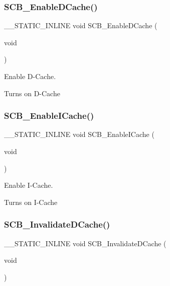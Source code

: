 \subsubsection{\texorpdfstring{SCB\_EnableDCache()}{SCB\_EnableDCache()}}
{\footnotesize\ttfamily \+\_\+\+\_\+\+S\+T\+A\+T\+I\+C\+\_\+\+I\+N\+L\+I\+NE void S\+C\+B\+\_\+\+Enable\+D\+Cache (\begin{DoxyParamCaption}\item[{void}]{ }\end{DoxyParamCaption})}



Enable D-\/\+Cache. 

Turns on D-\/\+Cache \mbox{\label{group__CMSIS__Core__CacheFunctions_gaf9e7c6c8e16ada1f95e5bf5a03505b68}} 
\subsubsection{\texorpdfstring{SCB\_EnableICache()}{SCB\_EnableICache()}}
{\footnotesize\ttfamily \+\_\+\+\_\+\+S\+T\+A\+T\+I\+C\+\_\+\+I\+N\+L\+I\+NE void S\+C\+B\+\_\+\+Enable\+I\+Cache (\begin{DoxyParamCaption}\item[{void}]{ }\end{DoxyParamCaption})}



Enable I-\/\+Cache. 

Turns on I-\/\+Cache \mbox{\label{group__CMSIS__Core__CacheFunctions_gace2d30db08887d0bdb818b8a785a5ce6}} 
\subsubsection{\texorpdfstring{SCB\_InvalidateDCache()}{SCB\_InvalidateDCache()}}
{\footnotesize\ttfamily \+\_\+\+\_\+\+S\+T\+A\+T\+I\+C\+\_\+\+I\+N\+L\+I\+NE void S\+C\+B\+\_\+\+Invalidate\+D\+Cache (\begin{DoxyParamCaption}\item[{void}]{ }\end{DoxyParamCaption})}



